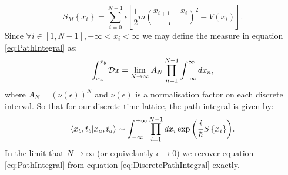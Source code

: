 \documentclass[12pt]{article}
\begin{document}
\begin{equation}
	\label{eq:DiscreteMinkowskiAction}
	S_{M}\left\{x_i\right\} = \sum_{i=0}^{N-1} \epsilon \left[\frac{1}{2}m\left(\frac{x_{i+1}-x_{i}}{\epsilon}\right)^{2} - V\left(x_i\right)\right].
\end{equation}
Since $\forall i \in \left[1,N-1\right], -\infty < x_i < \infty$ we may define the measure in equation \ref{eq:PathIntegral} as:
\begin{equation}
	\label{eq:IntegralMeasure}
	\int_{x_a}^{x_b} {\cal D} x = \lim_{N\rightarrow \infty} A_{N}\prod_{n=1}^{N-1}\int_{-\infty}^{\infty}dx_n,
\end{equation}
where $A_N = \left(\nu \left(\epsilon\right)\right)^{N}$ and $\nu \left(\epsilon\right)$ is a normalisation factor on each discrete interval. So that for our discrete time lattice, the path integral is given by:
\begin{equation}
	\label{eq:DiscretePathIntegral}
	\braket{x_b,t_b|x_a,t_a} \sim \int^{+\infty}_{-\infty}\prod_{i=1}^{N-1}dx_i \exp{\left(\frac{i}{\hbar}S\left\{x_i\right\}\right)}.
\end{equation}
In the limit that $N\rightarrow \infty$ (or equivelantly $\epsilon \rightarrow 0$) we recover equation \ref{eq:PathIntegral} from equation \ref{eq:DiscretePathIntegral} exactly. 
\end{document}

